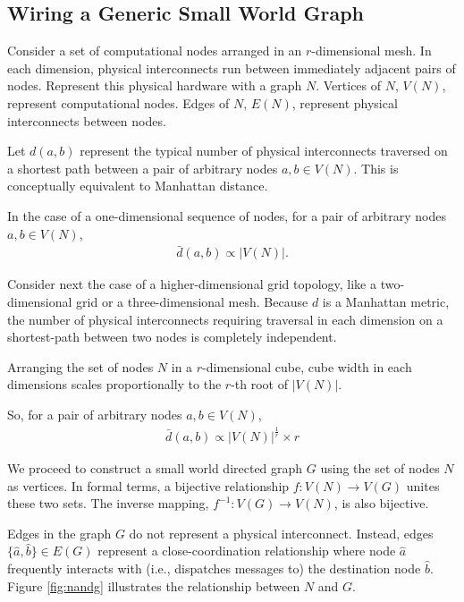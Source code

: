 \subsection{Wiring a Generic Small World Graph} \label{sec:proof1}

Consider a set of computational nodes arranged in an $r$-dimensional mesh.
In each dimension, physical interconnects run between immediately adjacent pairs of nodes.
Represent this physical hardware with a graph $N$.
Vertices of $N$, $V(N)$, represent computational nodes.
Edges of $N$, $E(N)$, represent physical interconnects between nodes.

Let $d(a,b)$ represent the typical number of physical interconnects traversed on a shortest path between a pair of arbitrary nodes $a, b \in V(N)$.
This is conceptually equivalent to Manhattan distance.

In the case of a one-dimensional sequence of nodes, for a pair of arbitrary nodes $a,b \in V(N)$,
\begin{align*}
\bar{d}(a,b) \propto |V(N)|.
\end{align*}

Consider next the case of a higher-dimensional grid topology, like a two-dimensional grid or a three-dimensional mesh.
Because $d$ is a Manhattan metric, the number of physical interconnects requiring traversal in each dimension on a shortest-path between two nodes is completely independent.

Arranging the set of nodes $N$ in a $r$-dimensional cube, cube width in each dimensions scales proportionally to the $r$-th root of $|V(N)|$.

So, for a pair of arbitrary nodes $a,b \in V(N)$,
\begin{align} \label{eqn:mesh_prop}
\bar{d}(a, b) \propto |V(N)|^{\frac{1}{r}} \times r
\end{align}

We proceed to construct a small world directed graph $G$ using the set of nodes $N$ as vertices.
In formal terms, a bijective relationship $f: V(N) \rightarrow V(G)$ unites these two sets.
The inverse mapping, $f^{-1}: V(G) \rightarrow V(N)$, is also bijective.



Edges in the graph $G$ do not represent a physical interconnect.
Instead, edges $\{\hat{a}, \hat{b}\} \in E(G)$ represent a close-coordination relationship where node $\hat{a}$ frequently interacts with (i.e., dispatches messages to) the destination node $\hat{b}$.
Figure \ref{fig:nandg} illustrates the relationship between $N$ and $G$.

